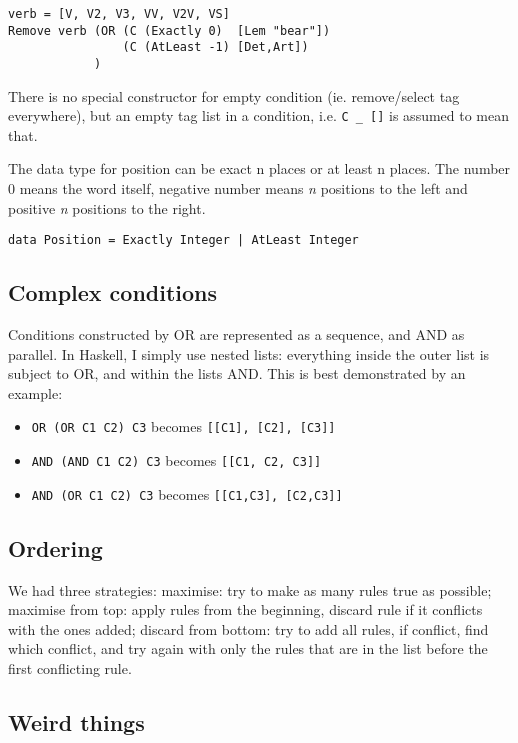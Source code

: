 \documentclass[a4paper, 11pt]{article}
\begin{document}
\begin{lstlisting}
verb = [V, V2, V3, VV, V2V, VS]
Remove verb (OR (C (Exactly 0)  [Lem "bear"])
                (C (AtLeast -1) [Det,Art])
            )
\end{lstlisting}

There is no special constructor for empty condition (ie. remove/select tag everywhere), but an empty tag list in a condition, i.e. \texttt{C \_ []} is assumed to mean that.

The data type for position can be exact n places or at least n places. The number 0 means the word itself, negative number means \emph{n} positions to the left and positive \emph{n} positions to the right.

\begin{lstlisting}
data Position = Exactly Integer | AtLeast Integer
 \end{lstlisting}

\subsection{Complex conditions}
Conditions constructed by OR are represented as a sequence, and AND as
parallel. In Haskell, I simply use nested lists: everything inside the
outer list is subject to OR, and within the lists AND. This is best
demonstrated by an example:

\begin{itemize}
\item \texttt{OR (OR C1 C2) C3} becomes \texttt{[[C1], [C2], [C3]]} 
\item \texttt{AND (AND C1 C2) C3} becomes \texttt{[[C1, C2, C3]]} 
\item \texttt{AND (OR C1 C2) C3} becomes \texttt{[[C1,C3], [C2,C3]]}
\end{itemize}

\subsection{Ordering}

We had three strategies:
maximise: try to make as many rules true as possible;
maximise from top: apply rules from the beginning, discard rule if it
conflicts with the ones added;
discard from bottom: try to add all rules, if conflict, find which
conflict, and try again with only the rules that are in the list
before the first conflicting rule.

\subsection{Weird things}
\end{document}
